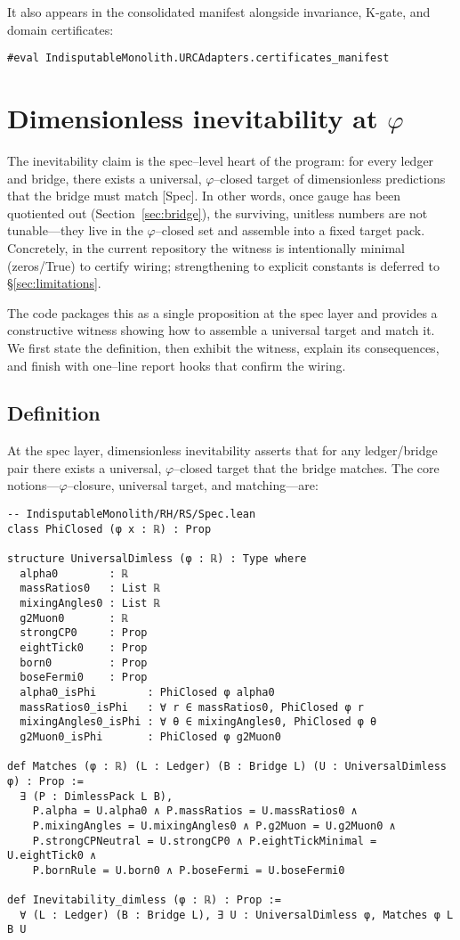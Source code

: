 \documentclass[11pt,a4paper,twoside]{article}
\numberwithin{equation}{section}
\newcommand{\phigr}{\varphi} %
\theoremstyle{customthm}
\theoremstyle{customdef}
\theoremstyle{customrem}
\begin{document}
\noindent It also appears in the consolidated manifest alongside invariance, K‑gate, and domain certificates:
\begin{lstlisting}
#eval IndisputableMonolith.URCAdapters.certificates_manifest
\end{lstlisting}

\section{Dimensionless inevitability at $\phigr$}\label{sec:phi}

The inevitability claim is the spec–level heart of the program: for every ledger and bridge, there exists a universal, $\phigr$–closed target of dimensionless predictions that the bridge must match [Spec]. In other words, once gauge has been quotiented out (Section~\ref{sec:bridge}), the surviving, unitless numbers are not tunable—they live in the $\phigr$–closed set and assemble into a fixed target pack. Concretely, in the current repository the witness is intentionally minimal (zeros/True) to certify wiring; strengthening to explicit constants is deferred to \S\ref{sec:limitations}.

The code packages this as a single proposition at the spec layer and provides a constructive witness showing how to assemble a universal target and match it. We first state the definition, then exhibit the witness, explain its consequences, and finish with one–line report hooks that confirm the wiring.

\subsection{Definition}

At the spec layer, dimensionless inevitability asserts that for any ledger/bridge pair there exists a universal, $\phigr$–closed target that the bridge matches. The core notions—$\phigr$–closure, universal target, and matching—are:

\begin{lstlisting}
-- IndisputableMonolith/RH/RS/Spec.lean
class PhiClosed (φ x : ℝ) : Prop

structure UniversalDimless (φ : ℝ) : Type where
  alpha0        : ℝ
  massRatios0   : List ℝ
  mixingAngles0 : List ℝ
  g2Muon0       : ℝ
  strongCP0     : Prop
  eightTick0    : Prop
  born0         : Prop
  boseFermi0    : Prop
  alpha0_isPhi        : PhiClosed φ alpha0
  massRatios0_isPhi   : ∀ r ∈ massRatios0, PhiClosed φ r
  mixingAngles0_isPhi : ∀ θ ∈ mixingAngles0, PhiClosed φ θ
  g2Muon0_isPhi       : PhiClosed φ g2Muon0

def Matches (φ : ℝ) (L : Ledger) (B : Bridge L) (U : UniversalDimless φ) : Prop :=
  ∃ (P : DimlessPack L B),
    P.alpha = U.alpha0 ∧ P.massRatios = U.massRatios0 ∧
    P.mixingAngles = U.mixingAngles0 ∧ P.g2Muon = U.g2Muon0 ∧
    P.strongCPNeutral = U.strongCP0 ∧ P.eightTickMinimal = U.eightTick0 ∧
    P.bornRule = U.born0 ∧ P.boseFermi = U.boseFermi0

def Inevitability_dimless (φ : ℝ) : Prop :=
  ∀ (L : Ledger) (B : Bridge L), ∃ U : UniversalDimless φ, Matches φ L B U
\end{lstlisting}
\end{document}
